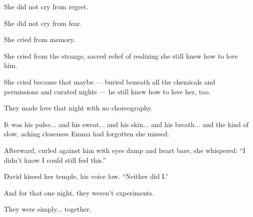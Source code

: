 She did not cry from regret. 

She did not cry from fear.

She cried from memory.

She cried from the strange, sacred relief of realizing she still knew how to love him.

She cried because that maybe --- buried beneath all the chemicals and permissions and curated nights --- 
he still knew how to love her, too.

They made love that night with no choreography. 

It was his pulse... and his sweat... and his skin... and his breath... and the kind of slow, 
aching closeness Emma had forgotten she missed.

Afterward, curled against him with eyes damp and heart bare, she whispered:
``I didn’t know I could still feel this.''

David kissed her temple, his voice low.
``Neither did I.''

And for that one night, they weren't experiments.

They were simply... together.

